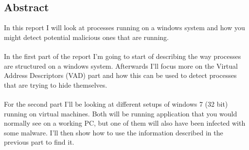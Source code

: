 \documentclass[a4paper]{article}
\author{Kristian Hougaard Olsen \inst{1}}
\begin{document}
\subsection*{Abstract}
%
In this report I will look at processes running on a windows system and how you might detect potential malicious ones that are running. \\ \\
%
In the first part of the report I’m going to start of describing the way processes are structured on a windows system. Afterwards I’ll focus more on the Virtual Address Descriptors (VAD) part and how this can be used to detect processes that are trying to hide themselves. \\ \\
%
%
For the second part I'll be looking at different setups of windows 7 (32 bit) running on virtual machines. Both will be running application that you would normally see on a working PC, but one of them will also have been infected with some malware. I'll then show how to use the information described in the previous part to find it. \\\\



\newpage
\end{document}
